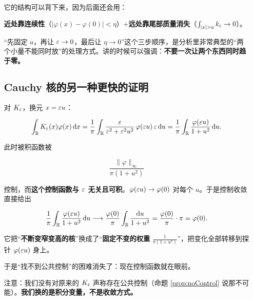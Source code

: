 \begin{ideabox}[这是全系列最值得掌握的一个估计]
它的结构可以背下来，因为后面还会用：

\begin{center}
\textbf{近处靠连续性}（$|\varphi(x)-\varphi(0)|<\eta$）\quad $+$\quad \textbf{远处靠尾部质量消失}（$\int_{|x|>a}k_\ep\to0$）。
\end{center}

“先固定 $a$，再让 $\varepsilon\to0$，最后让 $\eta\to0$”这个三步顺序，是分析里非常典型的“两个小量不能同时放”的处理方式。讲的时候可以强调：\textbf{不要一次让两个东西同时趋于零。}
\end{ideabox}

\subsection{Cauchy 核的另一种更快的证明}

对 $K_\varepsilon$，换元 $x=\varepsilon u$：

\begin{equation}
\int_{\mathbb{R}}K_\varepsilon(x)\varphi(x)\mathop{}\!\mathrm{d} x
=\frac{1}{\pi}\int_{\mathbb{R}}\frac{\varepsilon}{\varepsilon^{2}+\varepsilon^{2}u^{2}}\,\varphi(\varepsilon u)\,\varepsilon\mathop{}\!\mathrm{d} u
=\frac{1}{\pi}\int_{\mathbb{R}}\frac{\varphi(\varepsilon u)}{1+u^{2}}\mathop{}\!\mathrm{d} u .
\end{equation}

此时被积函数被

\begin{equation}
\frac{\|\varphi\|_\infty}{\pi(1+u^{2})}
\end{equation}

控制，而\textbf{这个控制函数与 $\varepsilon$ 无关且可积}。$\varphi(\varepsilon u)\to\varphi(0)$ 对每个 $u$。于是控制收敛直接给出

\begin{equation}
\frac{1}{\pi}\int_{\mathbb{R}}\frac{\varphi(\varepsilon u)}{1+u^{2}}\mathop{}\!\mathrm{d} u
\longrightarrow\frac{\varphi(0)}{\pi}\int_{\mathbb{R}}\frac{\mathop{}\!\mathrm{d} u}{1+u^{2}}
=\frac{\varphi(0)}{\pi}\cdot\pi=\varphi(0).
\end{equation}

\begin{ideabox}[换元做了什么]
它把“\textbf{不断变窄变高的核}”换成了“\textbf{固定不变的权重} $\frac{1}{\pi(1+u^{2})}$”，把变化全部转移到探针 $\varphi(\varepsilon u)$ 身上。

于是“找不到公共控制”的困难消失了：现在控制函数就在眼前。

注意：我们没有对原来的 $K_\varepsilon$ 声称存在公共控制（命题 \ref{prop:noControl} 说那不可能）。\textbf{我们换的是积分变量，不是收敛方式。}
\end{ideabox}

